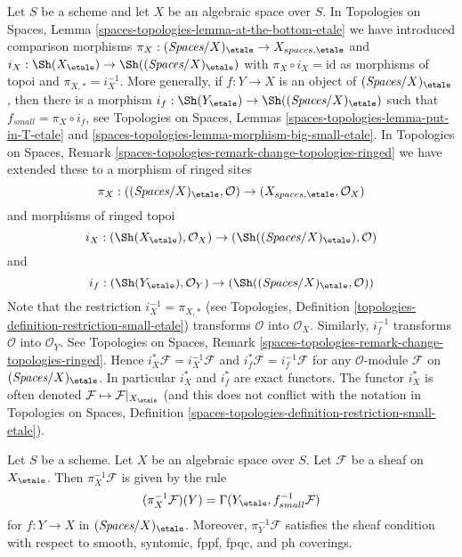 \noindent
Let $S$ be a scheme and let $X$ be an algebraic space over $S$.
In Topologies on Spaces, Lemma
\ref{spaces-topologies-lemma-at-the-bottom-etale}
we have introduced comparison morphisms
$\pi_X : (\textit{Spaces}/X)_\etale \to X_{spaces, \etale}$ and
$i_X : \Sh(X_\etale) \to \Sh((\textit{Spaces}/X)_\etale)$
with $\pi_X \circ i_X = \text{id}$ as morphisms of topoi and
$\pi_{X, *} = i_X^{-1}$.
More generally, if $f : Y \to X$ is an object of $(\textit{Spaces}/X)_\etale$,
then there is a morphism
$i_f : \Sh(Y_\etale) \to \Sh((\textit{Spaces}/X)_\etale)$
such that $f_{small} = \pi_X \circ i_f$, see
Topologies on Spaces, Lemmas \ref{spaces-topologies-lemma-put-in-T-etale} and
\ref{spaces-topologies-lemma-morphism-big-small-etale}. In
Topologies on Spaces, Remark
\ref{spaces-topologies-remark-change-topologies-ringed}
we have extended these to a morphism of ringed sites
$$
\pi_X :
((\textit{Spaces}/X)_\etale, \mathcal{O})
\to
(X_{spaces, \etale}, \mathcal{O}_X)
$$
and morphisms of ringed topoi
$$
i_X :
(\Sh(X_\etale), \mathcal{O}_X)
\to
(\Sh((\textit{Spaces}/X)_\etale), \mathcal{O})
$$
and
$$
i_f :
(\Sh(Y_\etale), \mathcal{O}_Y)
\to
(\Sh((\textit{Spaces}/X)_\etale, \mathcal{O}))
$$
Note that the restriction $i_X^{-1} = \pi_{X, *}$ (see
Topologies, Definition \ref{topologies-definition-restriction-small-etale})
transforms $\mathcal{O}$ into $\mathcal{O}_X$.
Similarly, $i_f^{-1}$ transforms $\mathcal{O}$ into $\mathcal{O}_Y$.
See Topologies on Spaces, Remark
\ref{spaces-topologies-remark-change-topologies-ringed}.
Hence $i_X^*\mathcal{F} = i_X^{-1}\mathcal{F}$ and
$i_f^*\mathcal{F} = i_f^{-1}\mathcal{F}$ for any $\mathcal{O}$-module
$\mathcal{F}$ on $(\textit{Spaces}/X)_\etale$. In particular $i_X^*$ and $i_f^*$
are exact functors. The functor $i_X^*$ is often denoted
$\mathcal{F} \mapsto \mathcal{F}|_{X_\etale}$ (and this does not
conflict with the notation in
Topologies on Spaces, Definition
\ref{spaces-topologies-definition-restriction-small-etale}).

\begin{lemma}
\label{lemma-describe-pullback}
Let $S$ be a scheme. Let $X$ be an algebraic space over $S$.
Let $\mathcal{F}$ be a sheaf on $X_\etale$. Then
$\pi_X^{-1}\mathcal{F}$ is given by the rule
$$
(\pi_X^{-1}\mathcal{F})(Y) = \Gamma(Y_\etale, f_{small}^{-1}\mathcal{F})
$$
for $f : Y \to X$ in $(\textit{Spaces}/X)_\etale$.
Moreover, $\pi_Y^{-1}\mathcal{F}$ satisfies the
sheaf condition with respect to smooth, syntomic, fppf, fpqc, and ph coverings.
\end{lemma}


